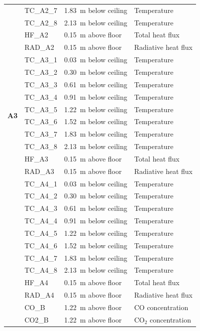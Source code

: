 \documentclass[12pt,oneside]{book}
\begin{document}
\begin{longtable}[c]{c|lll}
 & TC\_A2\_7  & 1.83~m below ceiling & Temperature \\
 & TC\_A2\_8  & 2.13~m below ceiling & Temperature \\
\cline{2-4}
 & HF\_A2	  & 0.15~m above floor   & Total heat flux \\
 & RAD\_A2    & 0.15~m above floor   & Radiative heat flux \\
\midrule
 \multirow{10}{*}{\large{\textbf{A3}}}
 & TC\_A3\_1  & 0.03~m below ceiling & Temperature \\
 & TC\_A3\_2  & 0.30~m below ceiling & Temperature \\
 & TC\_A3\_3  & 0.61~m below ceiling & Temperature \\
 & TC\_A3\_4  & 0.91~m below ceiling & Temperature \\
 & TC\_A3\_5  & 1.22~m below ceiling & Temperature \\
 & TC\_A3\_6  & 1.52~m below ceiling & Temperature \\
 & TC\_A3\_7  & 1.83~m below ceiling & Temperature \\
 & TC\_A3\_8  & 2.13~m below ceiling & Temperature \\
\cline{2-4}
 & HF\_A3	  & 0.15~m above floor   & Total heat flux \\
 & RAD\_A3    & 0.15~m above floor   & Radiative heat flux \\
\bottomrule
\newpage
\multirow{13}{*}{\large\textbf{A4}} 
 & TC\_A4\_1  & 0.03~m below ceiling & Temperature \\
 & TC\_A4\_2  & 0.30~m below ceiling & Temperature \\
 & TC\_A4\_3  & 0.61~m below ceiling & Temperature \\
 & TC\_A4\_4  & 0.91~m below ceiling & Temperature \\
 & TC\_A4\_5  & 1.22~m below ceiling & Temperature \\
 & TC\_A4\_6  & 1.52~m below ceiling & Temperature \\
 & TC\_A4\_7  & 1.83~m below ceiling & Temperature \\
 & TC\_A4\_8  & 2.13~m below ceiling & Temperature \\
\cline{2-4}
 & HF\_A4	  & 0.15~m above floor   & Total heat flux \\
 & RAD\_A4    & 0.15~m above floor   & Radiative heat flux \\
\cline{2-4}
 & CO\_B      & 1.22~m above floor   & CO concentration \\
 & CO2\_B     & 1.22~m above floor   & CO$_2$ concentration \\

\end{longtable}
\end{document}
